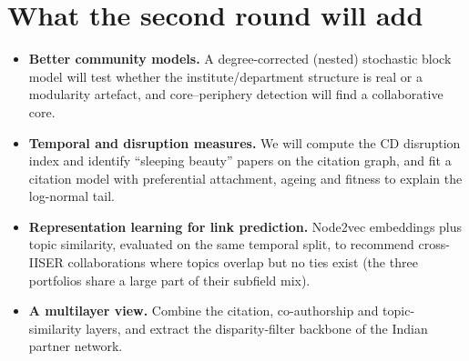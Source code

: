 \documentclass[10pt,a4paper]{article}
\begin{document}
\section{What the second round will add}
\begin{itemize}
\item \textbf{Better community models.} A degree-corrected (nested) stochastic block model will test whether the institute/department structure is real or a modularity artefact, and core--periphery detection will find a collaborative core.
\item \textbf{Temporal and disruption measures.} We will compute the CD disruption index and identify ``sleeping beauty'' papers on the citation graph, and fit a citation model with preferential attachment, ageing and fitness to explain the log-normal tail.
\item \textbf{Representation learning for link prediction.} Node2vec embeddings plus topic similarity, evaluated on the same temporal split, to recommend cross-IISER collaborations where topics overlap but no ties exist (the three portfolios share a large part of their subfield mix).
\item \textbf{A multilayer view.} Combine the citation, co-authorship and topic-similarity layers, and extract the disparity-filter backbone of the Indian partner network.
\end{itemize}
\end{document}
